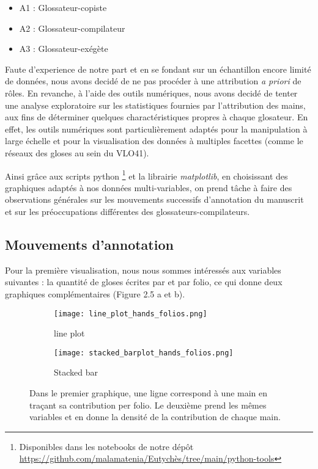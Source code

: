 \documentclass[a4paper, twoside, 12pt]{book}
\begin{document}
\begin{itemize}
    \item A1 : Glossateur-copiste
    \item A2 : Glossateur-compilateur
    \item A3 : Glossateur-exégète
\end{itemize}

Faute d'experience de notre part et en se fondant sur un échantillon encore limité de données, nous avons decidé de ne pas procéder à une attribution \textit{a priori} de rôles. En revanche, à l'aide des outils numériques, nous avons decidé de tenter une \og{} analyse exploratoire \fg{} sur les statistiques fournies par l'attribution des mains, aux fins de déterminer quelques charactéristiques propres à chaque glosateur. En effet, les outils numériques sont particulièrement adaptés pour la manipulation à large échelle et pour la visualisation des données à multiples facettes (comme le réseaux des gloses au sein du VLO41).

Ainsi grâce aux scripts python \footnote{Disponibles dans les notebooks de notre dépôt \url{https://github.com/malamatenia/Eutychès/tree/main/python-tools}} et la librairie \textit{matplotlib}, en choisissant des graphiques adaptés à nos données multi-variables, on prend tâche à faire des observations générales sur les mouvements successifs d'annotation du manuscrit et sur les préoccupations différentes des glossateurs-compilateurs.\\

\subsection{Mouvements d'annotation}

Pour la première visualisation, nous nous sommes intéressés aux variables suivantes : la quantité de gloses écrites par et par folio, ce qui donne deux graphiques complémentaires (Figure 2.5 a et b).

\begin{figure}[H]
    \begin{subfigure}{0.50\textwidth}
    \centering
    \texttt{[image: line\_plot\_hands\_folios.png]}
    \caption{line plot}
    \end{subfigure}
    \begin{subfigure}{0,50\linewidth}
    \centering
    \texttt{[image: stacked\_barplot\_hands\_folios.png]}
    \caption{Stacked bar}
    \end{subfigure}
    \caption{Dans le premier graphique, une ligne correspond à une main en traçant sa contribution per folio. Le deuxième prend les mêmes variables et en donne la densité de la contribution de chaque main.}
\end{figure} 
\end{document}
